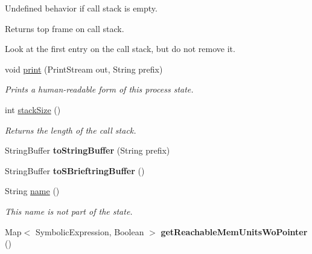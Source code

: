 \begin{DoxyCompactItemize}
\begin{DoxyCompactList}
Undefined behavior if call stack is empty.

\begin{DoxyReturn}{Returns}
top frame on call stack.
\end{DoxyReturn}
 Look at the first entry on the call stack, but do not remove it. \end{DoxyCompactList}\item 
void \hyperlink{classedu_1_1udel_1_1cis_1_1vsl_1_1civl_1_1state_1_1common_1_1immutable_1_1ImmutableProcessState_a355fe8e99c9078c48e95789a259ec95c}{print} (Print\+Stream out, String prefix)
\begin{DoxyCompactList}\small\item\em Prints a human-\/readable form of this process state. \end{DoxyCompactList}\item 
int \hyperlink{classedu_1_1udel_1_1cis_1_1vsl_1_1civl_1_1state_1_1common_1_1immutable_1_1ImmutableProcessState_a802ad0474e539455212ddf903a8fc4e1}{stack\+Size} ()
\begin{DoxyCompactList}\small\item\em Returns the length of the call stack. \end{DoxyCompactList}\item 
\hypertarget{classedu_1_1udel_1_1cis_1_1vsl_1_1civl_1_1state_1_1common_1_1immutable_1_1ImmutableProcessState_ac4c1aa773732af9b6f1adeb478acb3be}{}String\+Buffer {\bfseries to\+String\+Buffer} (String prefix)\label{classedu_1_1udel_1_1cis_1_1vsl_1_1civl_1_1state_1_1common_1_1immutable_1_1ImmutableProcessState_ac4c1aa773732af9b6f1adeb478acb3be}

\item 
\hypertarget{classedu_1_1udel_1_1cis_1_1vsl_1_1civl_1_1state_1_1common_1_1immutable_1_1ImmutableProcessState_a3bfaf5eda4b93c24a563c2a71541a221}{}String\+Buffer {\bfseries to\+S\+Brieftring\+Buffer} ()\label{classedu_1_1udel_1_1cis_1_1vsl_1_1civl_1_1state_1_1common_1_1immutable_1_1ImmutableProcessState_a3bfaf5eda4b93c24a563c2a71541a221}

\item 
String \hyperlink{classedu_1_1udel_1_1cis_1_1vsl_1_1civl_1_1state_1_1common_1_1immutable_1_1ImmutableProcessState_a5b5acfbf5447a51b6be171fbfd370990}{name} ()
\begin{DoxyCompactList}\small\item\em This name is not part of the state. \end{DoxyCompactList}\item 
\hypertarget{classedu_1_1udel_1_1cis_1_1vsl_1_1civl_1_1state_1_1common_1_1immutable_1_1ImmutableProcessState_ab0304ccdf46191f77c9cc42674a8b78d}{}Map$<$ Symbolic\+Expression, Boolean $>$ {\bfseries get\+Reachable\+Mem\+Units\+Wo\+Pointer} ()\label{classedu_1_1udel_1_1cis_1_1vsl_1_1civl_1_1state_1_1common_1_1immutable_1_1ImmutableProcessState_ab0304ccdf46191f77c9cc42674a8b78d}


\end{DoxyCompactItemize}
